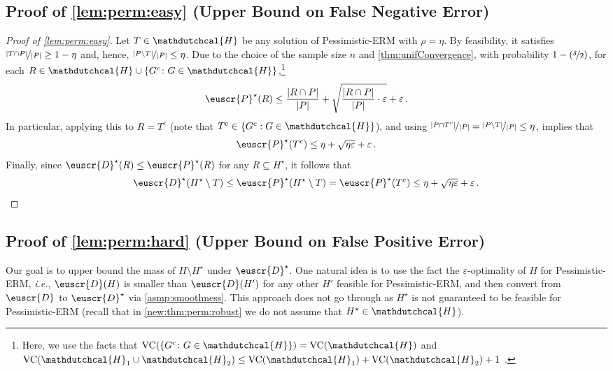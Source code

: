\documentclass[11pt]{article}
\theoremstyle{plain}
\theoremstyle{definition}
\theoremstyle{remark}
\def\abs#1{\left| #1 \right|}
\newcommand{\inbrace}[1]{\left\{#1\right\}}
\newcommand{\inparen}[1]{\left(#1\right)}
\newcommand{\nfrac}[2]{\nicefrac{#1}{#2}}
\newcommand{\vc}{\textrm{\rm VC}}
\newcommand{\eps}{\varepsilon}
\newcommand{\customcal}[1]{\euscr{#1}}
\newcommand{\cD}{\customcal{D}}
\newcommand{\cP}{\customcal{P}}
\newcommand{\ie}{\textit{i.e.}}
\newcommand{\hypo}[1]{\mathdutchcal{#1}}
\newcommand{\hyH}{\hypo{H}}
\newcommand{\pERM}{Pessimistic-ERM}
\newcommand{\optset}{{H^\star}}
\newcommand{\cDtrue}{\cD^\star}
\newcommand{\cDgiven}{\cD}
\newcommand{\cPtrue}{\cP^\star}
\begin{document}
        \subsection{Proof of \cref{lem:perm:easy} (Upper Bound on False Negative Error)}
        \begin{proof}[Proof of \cref{lem:perm:easy}]
            Let $T\in\hyH$ be any solution of \pERM{} with $\rho=\eta$. By feasibility, it satisfies $\nfrac{\abs{ T \cap P}}{\abs{P}}\geq 1- \eta $ and, hence, $\nfrac{\abs{ P\setminus T}}{\abs{P}}\leq \eta$.
            Due to the choice of the sample size $n$ and \cref{thm:unifConvergence}, with probability $1-\inparen{\nfrac{\delta}{2}}$, for each $R\in \hyH\cup \inbrace{G^c\colon G\in \hyH}$,\footnote{Here, we use the facts that $\vc{(\inbrace{G^c\colon G\in \hyH})}=\vc{(\hyH)}$ and $\vc{(\hyH_1\cup\hyH_2)}\leq {\vc{(\hyH_1)}+\vc{(\hyH_2)}+1}$ \cite{mohri2018foundations}.}
            \[
                \cPtrue(R) 
                \leq 
                \frac{\abs{R\cap P}}{\abs{P}}
                +
                \sqrt{\frac{\abs{R\cap P}}{\abs{P}}\cdot \eps}
                + \eps\,.
            \]
            In particular, applying this to $R=T^c$ (note that $T^c\in\{G^c: G\in \hyH\}$), and using $\nfrac{\abs{ P\cap T^c}}{\abs{P}}=\nfrac{\abs{ P\setminus T}}{\abs{P}}\leq \eta$, implies that 
            \[
                \cPtrue(T^c) \leq \eta+\sqrt{\eta\eps}+\eps\,.
            \]
            Finally, since $\cDtrue( R )\leq \cPtrue( R )$ for any $ R \subseteq \optset$, it follows that 
            \[
                \cDtrue(\optset\setminus  T )
                \leq \cPtrue(\optset\setminus  T )
                = \cPtrue(T^c)
                \leq  \eta +\sqrt{\eta\eps}+\eps\,.
            \]  
        \end{proof}


        
        \subsection{Proof of \cref{lem:perm:hard} {(Upper Bound on False Positive Error)}}
            Our goal is to upper bound the mass of $H\setminus \optset$ under $\cDtrue$. 
            One natural idea is to use the fact the $\eps$-optimality of $H$ for \pERM{}, \ie{},  $\cDgiven(H)$ is smaller than $\cD(H')$ for any other $H'$ feasible for \pERM{}, and then convert from $\cDgiven$ to $
            \cDtrue$ via \cref{asmp:smoothness}.
            This approach does not go through as $\optset$ is not guaranteed to be feasible for \pERM{} (recall that in \cref{new:thm:perm:robust} we do not assume that $\optset\in \hyH$). %
            
\end{document}
